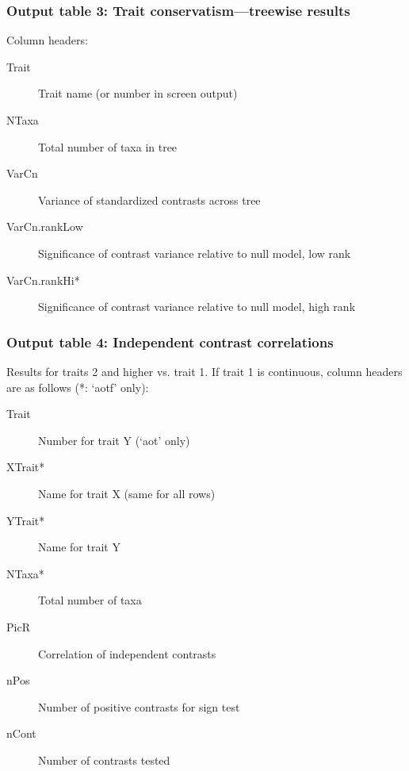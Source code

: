 \documentclass[12pt,letterpaper]{article}
\begin{document}
\subsubsection{Output table 3: Trait conservatism---treewise results}

Column headers:

\begin{description}

\item[\hspace{1em} Trait] Trait name (or number in screen output)
\item[\hspace{1em} NTaxa] Total number of taxa in tree
\item[\hspace{1em} VarCn] Variance of standardized contrasts across tree
\item[\hspace{1em} VarCn.rankLow] Significance of contrast variance relative to
  null model, low rank
\item[\hspace{1em} VarCn.rankHi*] Significance of contrast variance relative to
  null model, high rank
\end{description}

\subsubsection{Output table 4: Independent contrast correlations}

Results for traits 2 and higher vs. trait 1. If trait 1 is continuous,
column headers are as follows (*: `aotf' only):

\begin{description}
\item[\hspace{1em} Trait] Number for trait Y (`aot' only)
\item[\hspace{1em} XTrait*] Name for trait X (same for all rows)
\item[\hspace{1em} YTrait*] Name for trait Y
\item[\hspace{1em} NTaxa*] Total number of taxa
\item[\hspace{1em} PicR] Correlation of independent contrasts
\item[\hspace{1em} nPos] Number of positive contrasts for sign test
\item[\hspace{1em} nCont] Number of contrasts tested
\end{description}
\end{document}
